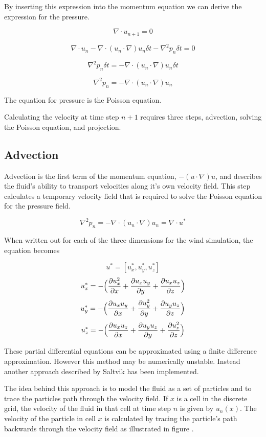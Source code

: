 By inserting this expression into the momentum equation we can derive the
expression for the pressure. 

$$ \nabla \cdot u_{n+1} = 0 $$

$$ \nabla \cdot u_n - \nabla \cdot (u_n \cdot \nabla)u_n \delta t - \nabla^2 p_n \delta t = 0 $$

$$ \nabla^2 p_n \delta t = - \nabla \cdot (u_n \cdot \nabla)u_n \delta t $$

$$ \nabla^2 p_n = - \nabla \cdot (u_n \cdot \nabla)u_n $$

The equation for pressure is the Poisson equation. 

Calculating the velocity at time step $n+1$ requires three steps, advection, 
solving the Poisson equation, and projection.

\subsection{Advection}

Advection is the first term of the momentum equation, $-(u \cdot \nabla)u$, and
describes the fluid's ability to transport velocities along it's own velocity 
field. This step calculates a temporary velocity field that is required to solve
the Poisson equation for the pressure field.

$$ \nabla^2 p_n = - \nabla \cdot (u_n \cdot \nabla)u_n = \nabla \cdot u^* $$

When written out for each of the three dimensions for the wind simulation, the
equation becomes

$$ u^* = [u^*_x, u^*_y, u^*_z] $$
$$ u^*_x = - \Big( \frac{\partial u_x^2}{\partial x} + \frac{\partial u_x u_y}{\partial y} + \frac{\partial u_x u_z}{\partial z}\Big) $$
$$ u^*_y = - \Big( \frac{\partial u_x u_y}{\partial x} + \frac{\partial u_y^2}{\partial y} + \frac{\partial u_y u_z}{\partial z}\Big) $$
$$ u^*_z = - \Big( \frac{\partial u_x u_z}{\partial x} + \frac{\partial u_y u_z}{\partial y} + \frac{\partial u_z^2}{\partial z}\Big) $$

These partial differential equations can be approximated using a finite difference
approximation. However this method may be numerically unstable. Instead another
approach described by Saltvik\cite{originalSnowThesis} has been implemented.

The idea behind this approach is to model the fluid as a set of particles and to
trace the particles path through the velocity field. If $x$ is a cell in the
discrete grid, the velocity of the fluid in that cell at time step $n$ is given 
by $u_n(x)$. The velocity of the particle in cell $x$ is calculated by tracing
the particle's path backwards through the velocity field as illustrated in
figure .


